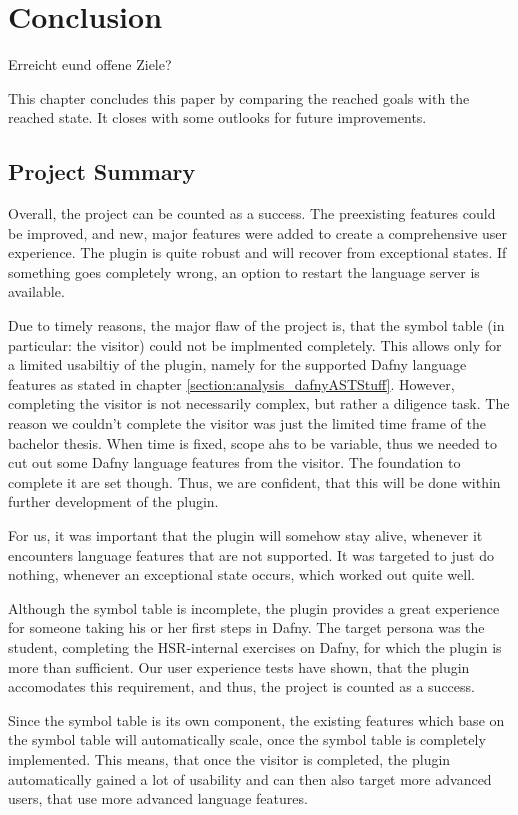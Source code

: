 \section{Conclusion}
\label{section:conclusion}
Erreicht eund offene Ziele?


This chapter concludes this paper by comparing the reached goals with the reached state. 
It closes with some outlooks for future improvements.

\subsection{Project Summary}
Overall, the project can be counted as a success.
The preexisting features could be improved, and new, major features were added to create a comprehensive user experience.
The plugin is quite robust and will recover from exceptional states.
If something goes completely wrong, an option to restart the language server is available.

Due to timely reasons, the major flaw of the project is, that the symbol table (in particular: the visitor) could not be implmented completely.
This allows only for a limited usabiltiy of the plugin, namely for the supported Dafny language features as stated in chapter \ref{section:analysis_dafnyASTStuff}.
However, completing the visitor is not necessarily complex, but rather a diligence task.
The reason we couldn't complete the visitor was just the limited time frame of the bachelor thesis.
When time is fixed, scope ahs to be variable, thus we needed to cut out some Dafny language features from the visitor. \cite{keller}
The foundation to complete it are set though.
Thus, we are confident, that this will be done within further development of the plugin.

For us, it was important that the plugin will somehow stay alive, whenever it encounters language features that are not supported.
It was targeted to just do nothing, whenever an exceptional state occurs, which worked out quite well.

Although the symbol table is incomplete, the plugin provides a great experience for someone taking his or her first steps in Dafny.
The target persona was the student, completing the HSR-internal exercises on Dafny, for which the plugin is more than sufficient.
Our user experience tests have shown, that the plugin accomodates this requirement, and thus, the project is counted as a success.

Since the symbol table is its own component, the existing features which base on the symbol table will automatically scale, once the symbol table is completely implemented.
This means, that once the visitor is completed, the plugin automatically gained a lot of usability and can then also target more advanced users, that use more advanced language features.

